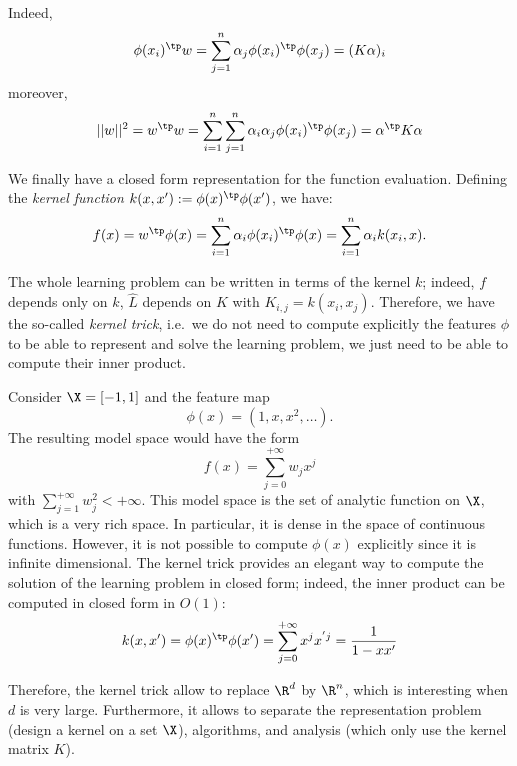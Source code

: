 \documentclass[toc]{../cs-classes/cs-classes}
\begin{document}
Indeed,
\begin{equation*}
    \phi(x_i)^\tp w = \sum_{j=1}^n \alpha_j\phi(x_i)^\tp\phi(x_j) = (K\alpha)_i
\end{equation*}
moreover,
\begin{equation*}
    ||w||^2 = w^\tp w = \sum_{i=1}^n\sum_{j=1}^n \alpha_i\alpha_j\phi(x_i)^\tp\phi(x_j) = \alpha^\tp K\alpha
\end{equation*}

We finally have a closed form representation for the function evaluation. Defining the \emph{kernel function} $k(x, x'):=\phi(x)^\tp \phi(x')$, we have:
\begin{equation*}
    f(x) = w^\tp\phi(x) = \sum_{i=1}^n \alpha_i\phi(x_i)^\tp\phi(x) = \sum_{i=1}^n \alpha_i k(x_i, x).
\end{equation*}

\begin{remark}
    The whole learning problem can be written in terms of the kernel $k$; indeed, $f$ depends only on $k$, $\hat{L}$ depends on $K$ with $K_{i, j} = k(x_i, x_j)$. Therefore, we have the so-called \emph{kernel trick}, i.e.~we do not need to compute explicitly the features $\phi$ to be able to represent and solve the learning problem, we just need to be able to compute their inner product.
\end{remark}

\begin{example}
    \leavevmode
    
    \noindent
    Consider $\X=\lbrack-1, 1\rbrack$ and the feature map
    \begin{equation*}
        \phi(x)=(1, x, x^2, \dots).
    \end{equation*}
    The resulting model space would have the form
    \begin{equation*}
        f(x)=\sum_{j=0}^{+\infty}w_jx^j
    \end{equation*}
    with $\sum_{j=1}^{+\infty}w_j^2 < +\infty$. This model space is the set of analytic function on $\X$, which is a very rich space. In particular, it is dense in the space of continuous functions. However, it is not possible to compute $\phi(x)$ explicitly since it is infinite dimensional. The kernel trick provides an elegant way to compute the solution of the learning problem in closed form; indeed, the inner product can be computed in closed form in $O(1)$:
    \begin{equation*}
        k(x, x') = \phi(x)^\tp\phi(x')=\sum_{j=0}^{+\infty}x^jx^{'j} = \frac{1}{1-xx'}
    \end{equation*}

    Therefore, the kernel trick allow to replace $\R^d$ by $\R^n$, which is interesting when $d$ is very large. Furthermore, it allows to separate the representation problem (design a kernel on a set $\X$), algorithms, and analysis (which only use the kernel matrix $K$).
\end{example}
\end{document}
